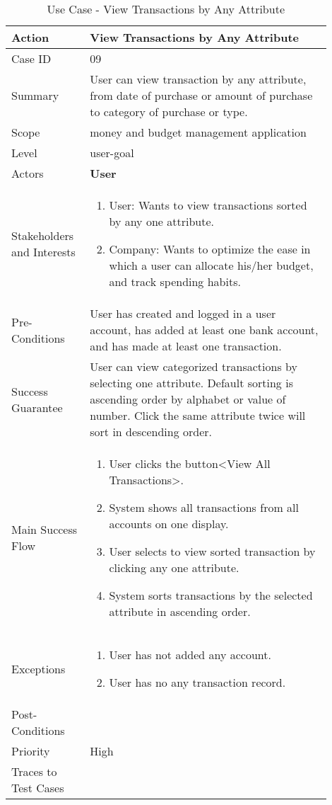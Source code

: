 \documentclass[11pt]{article}
\newcounter{use case ID}
\newcommand\tabularhead[1]{
    \begin{table}[ht]
        \addtocounter{use case ID}{1}
        \caption{Use Case \arabic{use case ID} - #1}
        \vspace{0.2cm}
        \begin{tabular}{|p{0.2\linewidth}|p{0.70\linewidth}|}
            \hline
            \textbf{Action} & \textbf{#1} \\
            \hline}
\newcommand\addrow[2]{#1 & #2\\ \hline}
\newcommand\addmulrow[2]{ \begin{minipage}[t][][t]{2.5cm}#1\end{minipage}
                &\begin{minipage}[t][][t]{11cm}
                    \begin{enumerate}[itemsep=-1ex] #2   \end{enumerate}
                \end{minipage}\vfill\\ \hline}
\newenvironment{usecase}{\tabularhead}
        {\hline\end{tabular}\end{table}}
\begin{document}
\begin{usecase}{View Transactions by Any Attribute}
    \addrow{Case ID}{09}
    \addrow{Summary}{User can view transaction by any attribute, from date of purchase or amount of purchase to category of purchase or type.}
    \addrow{Scope}{money and budget management application}
    \addrow{Level}{user-goal}
    \addrow{Actors}{\textbf{User}}
    \addmulrow{Stakeholders and Interests}{
    \item User: Wants to view transactions sorted by any one attribute.
    \item Company: Wants to optimize the ease in which a user can allocate his/her budget, and track spending habits.}
    \addrow{Pre-Conditions}{User has created and logged in a user account, has added at least one bank account, and has made at least one transaction.}
    \addrow{Success Guarantee}{User can view categorized transactions by selecting one attribute. Default sorting is ascending order by alphabet or value of number. Click the same attribute twice will sort in descending order.}
    \addmulrow{Main Success Flow}{
    \item User clicks the button<View All Transactions>.
    \item System shows all transactions from all accounts on one display.
    \item User selects to view sorted transaction by clicking any one attribute.
    \item System sorts transactions by the selected attribute in ascending order.}
    \addmulrow{Exceptions}{
    \item User has not added any account.
    \item User has no any transaction record.}
    \addrow{Post-Conditions}{}
    \addrow{Priority}{High}
    \addrow{Traces to Test Cases}{}
\end{usecase}
\end{document}
